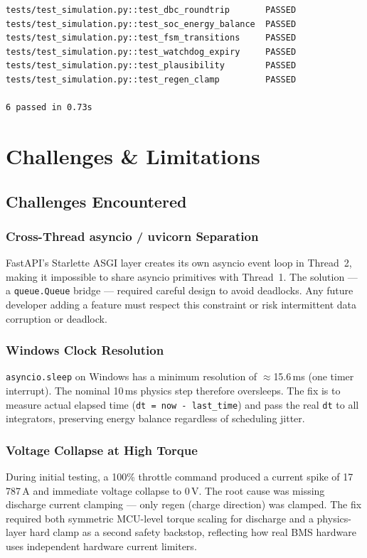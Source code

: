 \documentclass[12pt, a4paper, openany]{report}
\newcommand{\code}[1]{\texttt{#1}}
\begin{document}
\begin{center}
\begin{lstlisting}[style=shell]
tests/test_simulation.py::test_dbc_roundtrip       PASSED
tests/test_simulation.py::test_soc_energy_balance  PASSED
tests/test_simulation.py::test_fsm_transitions     PASSED
tests/test_simulation.py::test_watchdog_expiry     PASSED
tests/test_simulation.py::test_plausibility        PASSED
tests/test_simulation.py::test_regen_clamp         PASSED

6 passed in 0.73s
\end{lstlisting}

\chapter{Challenges \& Limitations}

\section{Challenges Encountered}

\subsection{Cross-Thread asyncio / uvicorn Separation}
FastAPI's Starlette ASGI layer creates its own asyncio event loop in
Thread~2, making it impossible to share asyncio primitives with Thread~1.
The solution --- a \code{queue.Queue} bridge --- required careful design
to avoid deadlocks. Any future developer adding a feature must respect this
constraint or risk intermittent data corruption or deadlock.

\subsection{Windows Clock Resolution}
\code{asyncio.sleep} on Windows has a minimum resolution of $\approx$15.6\,ms
(one timer interrupt). The nominal 10\,ms physics step therefore oversleeps.
The fix is to measure actual elapsed time (\code{dt = now - last\_time}) and
pass the real \code{dt} to all integrators, preserving energy balance
regardless of scheduling jitter.

\subsection{Voltage Collapse at High Torque}
During initial testing, a 100\% throttle command produced a current spike of
17\,787\,A and immediate voltage collapse to 0\,V. The root cause was missing
discharge current clamping --- only regen (charge direction) was clamped.
The fix required both symmetric MCU-level torque scaling for discharge and a
physics-layer hard clamp as a second safety backstop, reflecting how real BMS
hardware uses independent hardware current limiters.


\end{center}
\end{document}
